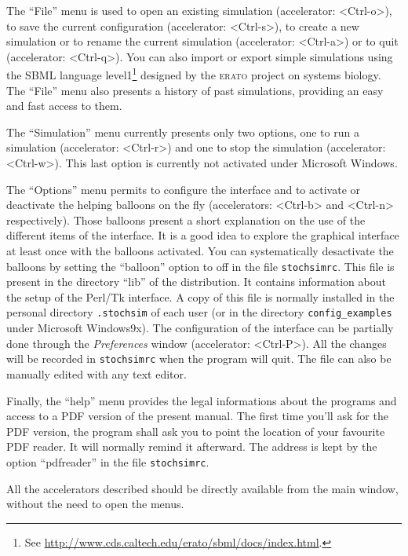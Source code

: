The ``File'' menu is used to open an existing simulation (accelerator:
\mbox{<Ctrl-o>}), to save the current configuration (accelerator:
\mbox{<Ctrl-s>}), to create a new simulation or to rename the current simulation
(accelerator: \mbox{<Ctrl-a>}) or to quit (accelerator: \mbox{<Ctrl-q>}). You
can also import or export simple simulations using the SBML language
level1\footnote{See
  \url{http://www.cds.caltech.edu/erato/sbml/docs/index.html}.}  designed by the
\textsc{erato} project on systems biology.  The ``File'' menu also presents a
history of past simulations, providing an easy and fast access to them.
  
The ``Simulation'' menu currently presents only two options, one to run a
simulation (accelerator: \mbox{<Ctrl-r>}) and one to stop the simulation
(accelerator: \mbox{<Ctrl-w>}). This last option is currently not activated
under Microsoft Windows.

The ``Options'' menu permits to configure the interface and to activate or
deactivate the helping balloons on the fly (accelerators: \mbox{<Ctrl-b>} and
\mbox{<Ctrl-n>} respectively).  Those balloons present a short explanation on
the use of the different items of the interface. It is a good idea to explore
the graphical interface at least once with the balloons activated. You can
systematically desactivate the balloons by setting the ``balloon'' option to off
in the file \texttt{stochsimrc}.  This file is present in the directory ``lib''
of the distribution. It contains information about the setup of the Perl/Tk
interface.  A copy of this file is normally installed in the personal directory
\texttt{.stochsim} of each user (or in the directory \texttt{config\_examples}
under Microsoft Windows9x). The configuration of the interface can be partially
done through the \emph{Preferences} window (accelerator: \mbox{<Ctrl-P>}).  All
the changes will be recorded in \texttt{stochsimrc} when the program will quit.
The file can also be manually edited with any text editor.

Finally, the ``help'' menu provides the legal informations about the programs
and access to a PDF version of the present manual. The
first time you'll ask for the PDF version, the program shall ask you to point
the location of your favourite PDF reader. It will normally remind it afterward.
The address is kept by the option ``pdfreader'' in the file \texttt{stochsimrc}.

All the accelerators described should be directly available from the main
window, without the need to open the menus.

